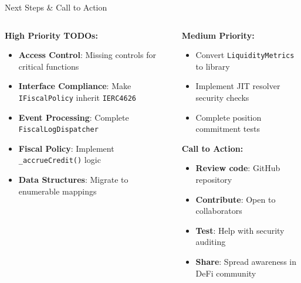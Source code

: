 \documentclass[aspectratio=169]{beamer}
\begin{document}
\begin{frame}{Next Steps \& Call to Action}
    \vspace{-0.2cm} %
    
    \begin{columns}
        \begin{column}{0.48\textwidth}
            \textbf{\textcolor{parityred}{High Priority TODOs:}}
            \begin{itemize}
                \item \textbf{Access Control}: Missing controls for critical functions
                \item \textbf{Interface Compliance}: Make \texttt{IFiscalPolicy} inherit \texttt{IERC4626}
                \item \textbf{Event Processing}: Complete \texttt{FiscalLogDispatcher}
                \item \textbf{Fiscal Policy}: Implement \texttt{\_accrueCredit()} logic
                \item \textbf{Data Structures}: Migrate to enumerable mappings
            \end{itemize}
        \end{column}
        \begin{column}{0.48\textwidth}
            \textbf{\textcolor{parityblue}{Medium Priority:}}
            \begin{itemize}
                \item Convert \texttt{LiquidityMetrics} to library
                \item Implement JIT resolver security checks
                \item Complete position commitment tests
            \end{itemize}
            
            \vspace{0.3cm}
            \textbf{\textcolor{paritygreen}{Call to Action:}}
            \begin{itemize}
                \item \textbf{Review code}: GitHub repository
                \item \textbf{Contribute}: Open to collaborators
                \item \textbf{Test}: Help with security auditing
                \item \textbf{Share}: Spread awareness in DeFi community
            \end{itemize}
        \end{column}
    \end{columns}
\end{frame}
\end{document}
